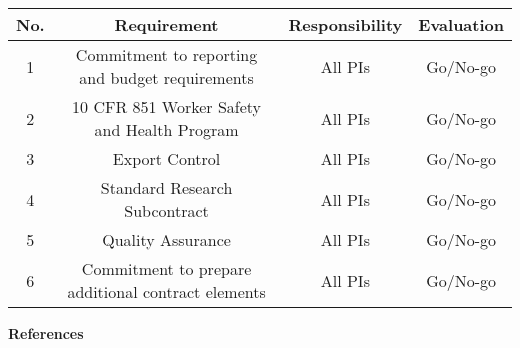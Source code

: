 \documentclass[11pt,letterpaper]{article}
\begin{document}
\begin{table}[h!]
    \centering
    \begin{tabular}{|c|c|c|c|}
        \hline
        \textbf{No.}
        &\textbf{Requirement}
        &\textbf{Responsibility}
        &\textbf{Evaluation}\\
        \hline
        1
        &Commitment to reporting and budget requirements
        &All PIs
        &Go/No-go \\
        \hline
        2
        &10 CFR 851 Worker Safety and Health Program
        &All PIs
        &Go/No-go \\
        \hline
        3
        &Export Control
        &All PIs
        &Go/No-go \\
        \hline
        4
        &Standard Research Subcontract
        &All PIs
        &Go/No-go \\
        \hline
        5
        &Quality Assurance
        &All PIs
        &Go/No-go \\
        \hline
        6
        &Commitment to prepare additional contract elements
        &All PIs
        &Go/No-go \\
        \hline
    \end{tabular}
    \label{tab-mandatory-requirements}
\end{table}
        
\vspace{\baselineskip}
        
\noindent\textbf{References}

\setlength{\bibhang}{0pt}

\end{document}
